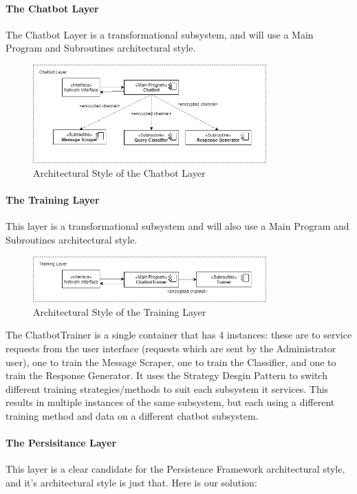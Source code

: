 \documentclass[11pt]{article}
\begin{document}
\paragraph{The Chatbot Layer}
The Chatbot Layer is a transformational subsystem, and will use a Main Program and Subroutines architectural style.

\begin{figure}[H]
	\centering
	\includegraphics[width=0.8\textwidth]{../../images/Chatbot_Layer_Architecture.png}
	\caption{Architectural Style of the Chatbot Layer}
\end{figure}

\paragraph{The Training Layer}
This layer is a transformational subsystem and will also use a Main Program and Subroutines architectural style.

\begin{figure}[H]
	\centering
	\includegraphics[width=0.8\textwidth]{../../images/Training_Layer_Architecture.png}
	\caption{Architectural Style of the Training Layer}
\end{figure}

The ChatbotTrainer is a single container that has 4 instances: these are to service requests from the user interface (requests which are sent by the Administrator user), one to train the Message Scraper, one to train the Classifier, and one to train the Response Generator. It uses the Strategy Desgin Pattern to switch different training strategies/methods to suit each subsystem it services. This results in multiple instances of the same subsystem, but each using a different training method and data on a different chatbot subsystem.

\paragraph{The Persisitance Layer}
This layer is a clear candidate for the Persistence Framework architectural style, and it's architectural style is just that. Here is our solution:
\end{document}
